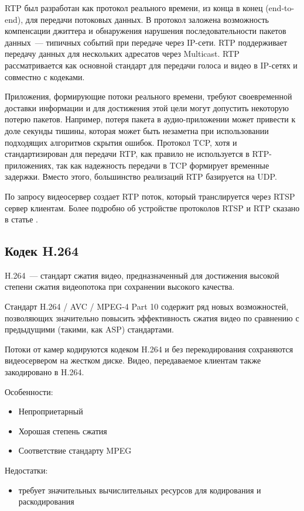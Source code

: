 RTP был разработан как протокол реального времени, из конца в конец (end-to-end), для передачи
потоковых данных. В протокол заложена возможность компенсации джиттера и обнаружения нарушения
последовательности пакетов данных~--- типичных событий при передаче через IP-сети. RTP поддерживает
передачу данных для нескольких адресатов через Multicast. RTP рассматривается как основной стандарт
для передачи голоса и видео в IP-сетях и совместно с кодеками.

Приложения, формирующие потоки реального времени, требуют своевременной доставки информации и для
достижения этой цели могут допустить некоторую потерю пакетов. Например, потеря пакета в
аудио-приложении может привести к доле секунды тишины, которая может быть незаметна при
использовании подходящих алгоритмов скрытия ошибок. Протокол TCP, хотя и стандартизирован для
передачи RTP, как правило не используется в RTP-приложениях, так как надежность передачи в TCP
формирует временные задержки. Вместо этого, большинство реализаций RTP базируется на UDP.

По запросу видеосервер создает RTP поток, который транслируется через RTSP сервер клиентам.
Более подробно об устройстве протоколов RTSP и RTP сказано в статье \cite{rtsp_about}.

\subsection{Кодек H.264}
H.264~--- стандарт сжатия видео, предназначенный для достижения высокой степени сжатия видеопотока
при сохранении высокого качества.

Стандарт H.264 / AVC / MPEG-4 Part 10 содержит ряд новых возможностей, позволяющих значительно
повысить эффективность сжатия видео по сравнению с предыдущими (такими, как ASP) стандартами.

Потоки от камер кодируются кодеком H.264 и без перекодирования сохраняются видеосервером на
жестком диске. Видео, передаваемое клиентам также закодировано в H.264.

\medskip

Особенности:
\smallskip
\begin{itemize}
	\item Непроприетарный
	\item Хорошая степень сжатия
	\item Соответствие стандарту MPEG
\end{itemize}

\medskip

Недостатки:
\smallskip
\begin{itemize}
	\item требует значительных вычислительных ресурсов для кодирования и раскодирования
\end{itemize}

